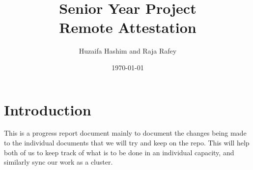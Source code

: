 \documentclass{article}
\title{Senior Year Project \\ Remote Attestation}
\author{Huzaifa Hashim and Raja Rafey}
\date{\today}
\begin{document}
\maketitle

\section{Introduction}

This is a progress report document mainly to document the changes being made to the individual documents that we will try and keep on the repo. This will help both of us to keep track of what is to be done in an individual capacity, and similarly sync our work as a cluster.
\end{document}

